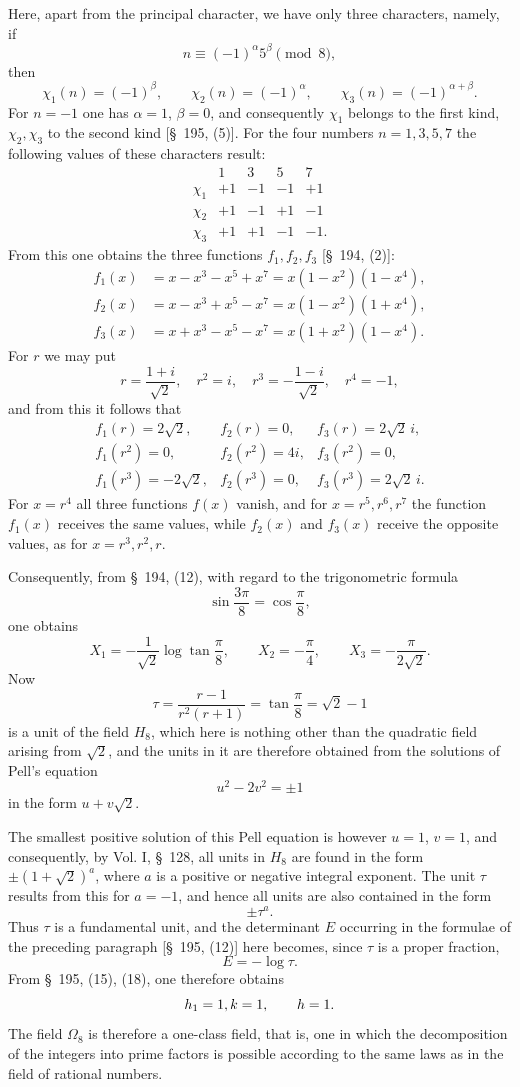 \documentclass[11pt]{article}
\begin{document}
Here, apart from the principal character, we have only three characters, namely, if
\[
n\equiv(-1)^\alpha5^\beta\pmod8,
\]
then
\[
\chi_1(n)=(-1)^\beta,
\qquad
\chi_2(n)=(-1)^\alpha,
\qquad
\chi_3(n)=(-1)^{\alpha+\beta}.
\]
For $n=-1$ one has $\alpha=1$, $\beta=0$, and consequently $\chi_1$ belongs to the first kind, $\chi_2,\chi_3$ to the second kind [\S~195, (5)]. For the four numbers $n=1,3,5,7$ the following values of these characters result:
\[
\begin{array}{c|rrrr}
&1&3&5&7\\\hline
\chi_1&+1&-1&-1&+1\\
\chi_2&+1&-1&+1&-1\\
\chi_3&+1&+1&-1&-1.
\end{array}
\]
From this one obtains the three functions $f_1,f_2,f_3$ [\S~194, (2)]:
\[
\begin{aligned}
f_1(x)&=x-x^3-x^5+x^7=x(1-x^2)(1-x^4),\\
f_2(x)&=x-x^3+x^5-x^7=x(1-x^2)(1+x^4),\\
f_3(x)&=x+x^3-x^5-x^7=x(1+x^2)(1-x^4).
\end{aligned}
\]
For $r$ we may put
\[
r=\frac{1+i}{\sqrt2},\quad r^2=i,
\quad r^3=-\frac{1-i}{\sqrt2},\quad r^4=-1,
\]
and from this it follows that
\[
\begin{array}{lll}
f_1(r)=2\sqrt2,& f_2(r)=0,& f_3(r)=2\sqrt2\,i,\\
f_1(r^2)=0,& f_2(r^2)=4i,& f_3(r^2)=0,\\
f_1(r^3)=-2\sqrt2,& f_2(r^3)=0,& f_3(r^3)=2\sqrt2\,i.
\end{array}
\]
For $x=r^4$ all three functions $f(x)$ vanish, and for $x=r^5,r^6,r^7$ the function $f_1(x)$ receives the same values, while $f_2(x)$ and $f_3(x)$ receive the opposite values, as for $x=r^3,r^2,r$.

Consequently, from \S~194, (12), with regard to the trigonometric formula
\[
\sin\frac{3\pi}{8}=\cos\frac\pi8,
\]
one obtains
\[
X_1=-\frac1{\sqrt2}\log\tan\frac\pi8,
\qquad
X_2=-\frac\pi4,
\qquad
X_3=-\frac\pi{2\sqrt2}.
\]
Now
\[
\tau=\frac{r-1}{r^2(r+1)}=\tan\frac\pi8=\sqrt2-1
\]
is a unit of the field $H_8$, which here is nothing other than the quadratic field arising from $\sqrt2$, and the units in it are therefore obtained from the solutions of Pell's equation
\[
u^2-2v^2=\pm1
\]
in the form $u+v\sqrt2$.

The smallest positive solution of this Pell equation is however $u=1$, $v=1$, and consequently, by Vol. I, \S~128, all units in $H_8$ are found in the form $\pm(1+\sqrt2)^a$, where $a$ is a positive or negative integral exponent. The unit $\tau$ results from this for $a=-1$, and hence all units are also contained in the form
\[
\pm\tau^a.
\]
Thus $\tau$ is a fundamental unit, and the determinant $E$ occurring in the formulae of the preceding paragraph [\S~195, (12)] here becomes, since $\tau$ is a proper fraction,
\[
E=-\log\tau.
\]
From \S~195, (15), (18), one therefore obtains
\[
h_1=1,\\ k=1,
\qquad h=1.
\]
The field $\Omega_8$ is therefore a one-class field, that is, one in which the decomposition of the integers into prime factors is possible according to the same laws as in the field of rational numbers.
\end{document}
